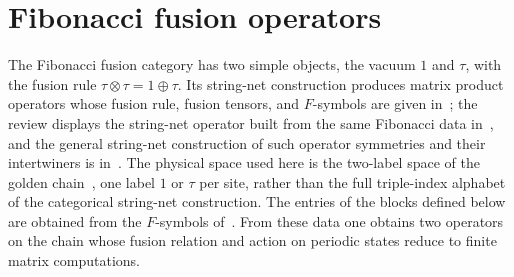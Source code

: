 \section{Fibonacci fusion operators}%
\label{sec:asymex_fibonacci}

The Fibonacci fusion category has two simple objects, the vacuum $1$
and $\tau$, with the fusion rule $\tau\otimes\tau=1\oplus\tau$. Its
string-net construction produces matrix product operators whose fusion
rule, fusion tensors, and $F$-symbols are given
in~\cite[Appendix~D.1]{Bultinck2017Anyons}; the review displays the
string-net operator built from the same Fibonacci data
in~\cite[Appendix~A, ``The MPO for the Fibonacci model'']{Cirac2021Matrix},
and the general string-net construction of such operator symmetries
and their intertwiners is in~\cite{Lootens2021MPOStringNet}. The
physical space used here is the two-label space of the golden
chain~\cite{Feiguin2007GoldenChain}, one label $1$ or $\tau$ per site,
rather than the full triple-index alphabet of the categorical
string-net construction. The entries of
the blocks defined below are obtained from the $F$-symbols
of~\cite[Appendix~D.1]{Bultinck2017Anyons}. From these data one obtains
two operators on the chain whose fusion relation and action on periodic
states reduce to finite matrix computations.

